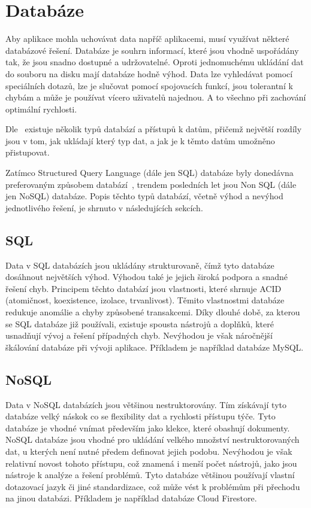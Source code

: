\section{Databáze}

Aby aplikace mohla uchovávat data napříč aplikacemi,
musí využívat některé databázové řešení.
Databáze je souhrn informací,
které jsou vhodně uspořádány tak,
že jsou snadno dostupné a udržovatelné.
Oproti jednomuchému ukládání dat do souboru na disku mají databáze hodně výhod.
Data lze vyhledávat pomocí speciálních dotazů,
lze je slučovat pomocí spojovacích funkcí,
jsou tolerantní k chybám
a může je používat vícero uživatelů najednou.
A to všechno při zachování optimální rychlosti.
\cite{database}

Dle~\cite{sql_nosql} existuje několik typů databází a přístupů k datům,
přičemž největší rozdíly jsou v tom,
jak ukládají který typ dat,
a jak je k těmto datům umožněno přistupovat.
\cite{sql_nosql}

Zatímco Structured Query Language (dále jen SQL) databáze byly donedávna
preferovaným způsobem databází~\cite{sql_nosql},
trendem posledních let jsou Non SQL (dále jen NoSQL) databáze.
Popis těchto typů databází,
včetně výhod a nevýhod jednotlivého řešení,
je shrnuto v následujících sekcích.

\subsection{SQL}

Data v SQL databázích jsou ukládány strukturovaně,
čímž tyto databáze dosáhnout největších výhod.
Výhodou také je jejich široká podpora a snadné řešení chyb.
Principem těchto databází jsou vlastnosti,
které shrnuje ACID (atomičnost, koexistence, izolace, trvanlivost).
Těmito vlastnostmi databáze redukuje anomálie a chyby způsobené transakcemi.
Díky dlouhé době,
za kterou se SQL databáze již používali,
existuje spousta nástrojů a doplňků,
které usnadňují vývoj a řešení případných chyb.
Nevýhodou je však náročnější škálování databáze při vývoji aplikace.
Příkladem je například databáze MySQL.
\cite{sql_nosql}

\subsection{NoSQL}

Data v NoSQL databázích jsou většinou nestruktorovány.
Tím získávají tyto databáze velký náskok co se flexibility dat a rychlosti
přístupu týče.
Tyto databáze je vhodné vnímat především jako klekce,
které obashují dokumenty. 
NoSQL databáze jsou vhodné pro ukládání velkého množství nestruktorovaných dat,
u kterých není nutné předem definovat jejich podobu.
Nevýhodou je však relativní novost tohoto přístupu,
což znamená i menší počet nástrojů,
jako jsou nástroje k analýze a řešení problémů.
Tyto databáze většinou používají vlastní dotazovací jazyk či jiné standardizace,
což může vést k problémům při přechodu na jinou databázi.
\cite{sql_nosql}
Příkladem je například databáze Cloud Firestore.
\cite{cloud_firestore}

